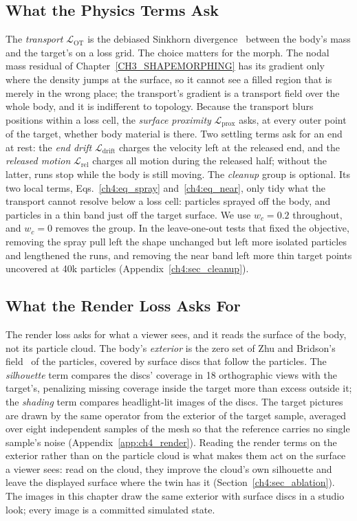 \subsection{What the Physics Terms Ask}
The \emph{transport} $\mathcal{L}_{\mathrm{OT}}$ is the debiased Sinkhorn divergence~\citep{feydy2019sinkhorn} between the
body's mass and the target's on a loss grid. The choice matters for the morph. The nodal mass residual of
Chapter~\ref{CH3_SHAPEMORPHING} has its gradient only where the density jumps at the surface, so it cannot see a filled
region that is merely in the wrong place; the transport's gradient is a transport field over the whole body, and it is
indifferent to topology. Because the transport blurs positions within a loss cell, the \emph{surface proximity}
$\mathcal{L}_{\mathrm{prox}}$ asks, at every outer point of the target, whether body material is there. Two settling terms
ask for an end at rest: the \emph{end drift} $\mathcal{L}_{\mathrm{drift}}$ charges the velocity left at the released end,
and the \emph{released motion} $\mathcal{L}_{\mathrm{rel}}$ charges all motion during the released half; without the
latter, runs stop while the body is still moving. The \emph{cleanup} group is optional. Its two local terms,
Eqs.~\eqref{ch4:eq_spray} and~\eqref{ch4:eq_near}, only tidy what the transport cannot resolve below a loss cell:
particles sprayed off the body, and particles in a thin band just off the target surface. We use $w_c=0.2$ throughout,
and $w_c=0$ removes the group. In the leave-one-out tests that fixed the objective, removing the spray pull left the
shape unchanged but left more isolated particles and lengthened the runs, and removing the near band left more thin
target points uncovered at 40k particles (Appendix~\ref{ch4:sec_cleanup}).

\subsection{What the Render Loss Asks For}
\label{ch4:sec_exterior}
The render loss asks for what a viewer sees, and it reads the surface of the body, not its particle cloud. The body's \emph{exterior} is the zero set of Zhu
and Bridson's field~\citep{10.1145/1073204.1073298} of the particles, covered by surface discs that follow the particles. The
\emph{silhouette} term compares the discs' coverage in 18 orthographic views with the target's, penalizing missing
coverage inside the target more than excess outside it; the \emph{shading} term compares headlight-lit images of the
discs. The target pictures are drawn by the same operator from the exterior of the target sample, averaged over eight
independent samples of the mesh so that the reference carries no single sample's noise (Appendix~\ref{app:ch4_render}).
Reading the render terms on the exterior rather than on the particle cloud is what makes them act on the surface a viewer
sees: read on the cloud, they improve the cloud's own silhouette and leave the displayed surface where the twin has it
(Section~\ref{ch4:sec_ablation}). The images in this chapter draw the same exterior with surface discs in a studio look;
every image is a committed simulated state.


